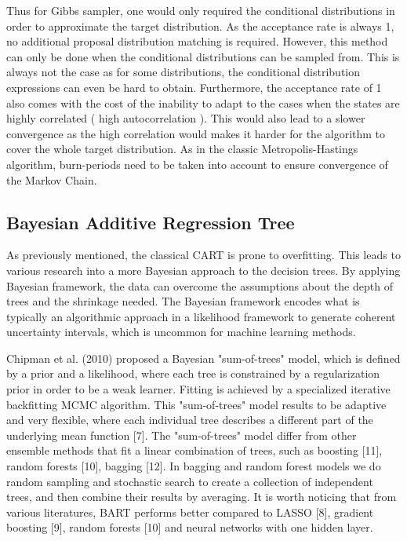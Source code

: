 \documentclass{usiinftr}
\begin{document}
Thus for Gibbs sampler, one would only required the conditional distributions in order to approximate the 
target distribution. As the acceptance rate is always 1, no additional proposal distribution matching is required. However, this method can only be done when the conditional distributions can be sampled from. This is always not the case as for some distributions, the conditional distribution expressions can even be hard to obtain. Furthermore, the acceptance rate of 1 also comes with the cost of the inability to adapt to the cases when the states are highly correlated ( high autocorrelation ). This would also lead to a slower convergence as the high correlation would makes it harder for the algorithm to cover the whole target distribution. As in the classic Metropolis-Hastings algorithm, burn-periods need to be taken into account to ensure convergence of the Markov Chain.

\subsection{Bayesian Additive Regression Tree}
As previously mentioned, the classical CART is prone to overfitting. This leads to various research into a more Bayesian approach to the decision trees. By applying Bayesian framework, the data can overcome the assumptions about the depth of trees and the shrinkage needed. The Bayesian framework encodes what is typically an algorithmic approach in a likelihood framework to generate coherent uncertainty intervals, which is uncommon for machine learning methods. 

 Chipman et al. (2010) proposed a Bayesian "sum-of-trees" model, which is defined by a prior and a likelihood, where each tree is constrained by a regularization prior in order to be a weak learner.  Fitting is achieved by a specialized iterative backfitting MCMC algorithm. This "sum-of-trees" model results to be adaptive and very flexible, where each individual tree describes a different part of the underlying mean function [7]. The "sum-of-trees" model differ from other ensemble methods that fit a linear combination of trees, such as boosting [11], random forests [10], bagging [12]. In bagging and random forest models we do random sampling and stochastic search to create a collection of independent trees, and then combine their results by averaging. It is worth noticing that from various literatures, BART performs better compared to LASSO [8], gradient boosting [9], random forests [10] and neural networks with one hidden layer. 
 
\end{document}
